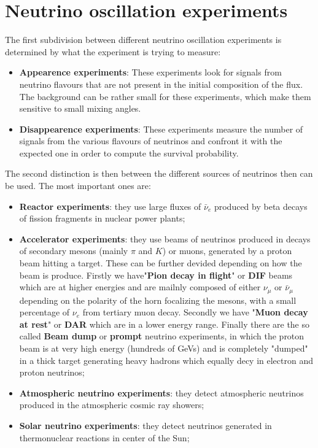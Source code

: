 \documentclass[12pt,a4paper,openright,twoside]{report}
\begin{document}
\section{Neutrino oscillation experiments}
The first subdivision between different neutrino oscillation experiments is determined by what the experiment is trying to measure:
\begin{itemize}
	\item \textbf{Appearence experiments}: These experiments look for signals from neutrino flavours that are not present in the initial composition of the flux. The background can be rather small for these experiments, which make them sensitive to small mixing angles.
	\item \textbf{Disappearence experiments}: These experiments measure the number of signals from the various flavours of neutrinos and confront it with the expected one in order to compute the survival probability.
\end{itemize}
The second distinction is then between the different sources of neutrinos then can be used. The most important ones are:
\begin{itemize}
	\item \textbf{Reactor experiments}: they use large fluxes of $\bar{\nu}_e$ produced by beta decays of fission fragments in nuclear power plants; 
	\item \textbf{Accelerator experiments}: they use beams of neutrinos produced in decays of secondary mesons (mainly $\pi$ and $K$) or muons, generated by a proton beam hitting a target. These can be further devided  depending on how the beam is produce. Firstly we have"\textbf{Pion decay in flight}" or \textbf{DIF} beams which are at higher energies and are mailnly composed of either $\nu_\mu$ or $\bar{\nu}_\mu$ depending on the polarity of the horn focalizing the mesons, with a small percentage of $\nu_e$ from tertiary muon decay. Secondly we have "\textbf{Muon decay at rest}" or \textbf{DAR} which are  in a lower energy range. Finally there are the so called \textbf{Beam dump} or \textbf{prompt} neutrino experiments, in which the proton beam is at very high energy (hundreds of GeVs) and is completely "dumped" in a thick target generating heavy hadrons which equally decy in electron and proton neutrinos;
	\item \textbf{Atmospheric neutrino experiments}: they detect atmospheric neutrinos produced in the atmospheric cosmic ray showers;
	\item \textbf{Solar neutrino experiments}: they detect neutrinos generated in thermonuclear reactions in center of the Sun;
\end{itemize}
\end{document}
